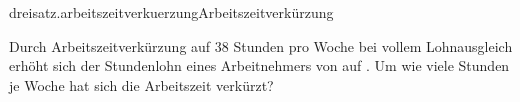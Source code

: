 \begin{exercise}{dreisatz.arbeitszeitverkuerzung}{Arbeitszeitverkürzung}
  \ifproblem\problem\par
    Durch Arbeitszeitverkürzung auf 38 Stunden pro Woche bei vollem Lohnausgleich
    erhöht sich der Stundenlohn eines Arbeitnehmers von  auf .
    Um wie viele Stunden je Woche hat sich die Arbeitszeit verkürzt?
  \fi
\end{exercise}
